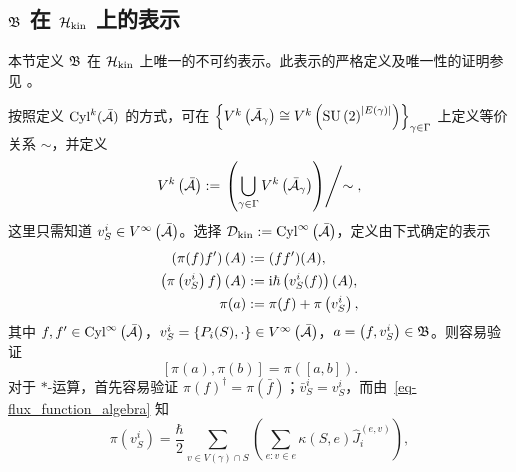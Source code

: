
		\subsection{\texorpdfstring{$\mathfrak{B}$ 在 $\mathcal{H}_{\text{kin}}$ 上的表示}{B 在希尔伯特空间 H 上的表示}}

			本节定义 $\mathfrak{B}$ 在 $\mathcal{H}_{\text{kin}}$ 上唯一的不可约表示。此表示的严格定义及唯一性的证明参见 \cite{Thiemann2007}。

			按照定义 $\mathrm{Cyl}^k(\bar{\mathcal{A}})$ 的方式，可在 $\left\{ V^k\left(\bar{\mathcal{A}}_\gamma\right) \cong V^k\left(\mathrm{SU}\left(2\right)^{\abs{E(\gamma)}}\right) \right\}_{\gamma\in \Gamma}$ 上定义等价关系 $\sim$，并定义
			\begin{equation}
				V^k\left( \bar{\mathcal{A}} \right) := \left. \left( \bigcup_{\gamma\in \Gamma} V^k\left( \bar{\mathcal{A}}_\gamma \right) \right) \middle/ \sim \right. ,
			\end{equation}
			这里只需知道 $v^i_S \in V^\infty\left( \bar{\mathcal{A}} \right)$。选择 $\mathcal{D}_{\text{kin}} := \mathrm{Cyl}^\infty \left( \bar{\mathcal{A}} \right)$，定义由下式确定的表示
			\begin{equation}
				\begin{split}
					\left( \pi(f)f' \right)(A) &:= (f f')(A),\\
					\left( \pi\left(v^i_S\right) f \right)(A) &:= \mathrm{i}\hbar \left( v^i_S(f) \right)(A),\\
					\pi(a) &:= \pi(f) + \pi\left(v^i_S\right),
				\end{split}
			\end{equation}
			其中 $f,f'\in \mathrm{Cyl}^\infty\left(\bar{\mathcal{A}}\right)$，$v^i_S = \left\{ P_i(S), \cdot \right\} \in V^\infty \left( \bar{\mathcal{A}} \right)$，$a=\left( f, v^i_S \right) \in \mathfrak{B}$。则容易验证
			\begin{equation}
				\left[ \pi(a), \pi(b) \right] = \pi\left( \left[ a,b \right] \right).
			\end{equation}
			对于 $*$-运算，首先容易验证 $\pi(f)^\dagger = \pi(\bar{f})$；$\bar{v}^i_S = v^i_S$，而由~\eqref{eq-flux_function_algebra} 知
			\begin{equation}
				\pi\left(v^i_S\right) = \frac{\hbar}{2} \sum_{v\in V(\gamma) \cap S} \left( \sum_{e:v\in e} \kappa(S,e) \hat{J}^{(e,v)}_i \right),\label{eq-flux_operator}
			\end{equation}
